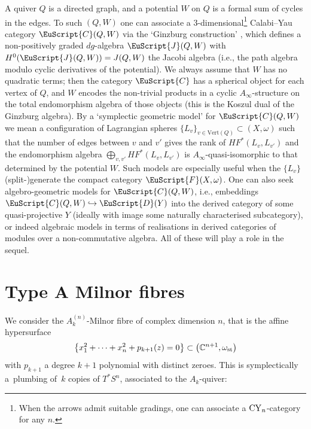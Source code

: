 \documentclass[10pt,a4paper]{amsart}
\def\scrJ{\EuScript{J}}
\newcommand{\scrF}{\EuScript{F}}
\newcommand{\scrC}{\EuScript{C}}
\def\bC{\mathbb{C}}
\def\scrD{\EuScript{D}}
\theoremstyle{definition}
\numberwithin{equation}{section}
\begin{document}
A quiver $Q$ is a directed graph, and a potential $W$ on $Q$ is a formal sum of cycles in the edges. To such $(Q,W)$ one can associate a 3-dimensional\footnote{When the arrows admit suitable gradings, one can associate a ${\rm CY}_n$-category for any $n$.} Calabi--Yau category $\scrC(Q,W)$ via the `Ginzburg construction' \cite{Ginzburg}, which defines a non-positively graded $dg$-algebra $\scrJ(Q,W)$ with $H^0(\scrJ(Q,W)) = J(Q,W)$ the Jacobi algebra (i.e., the path algebra modulo cyclic derivatives of the potential).
We always assume that $W$ has no quadratic terms; then the category $\scrC$ has a spherical object for each vertex of $Q$, and $W$ encodes the non-trivial products in a cyclic $A_{\infty}$-structure on the total endomorphism algebra of those objects (this is the Koszul dual of the Ginzburg algebra). By a `symplectic geometric model' for $\scrC(Q,W)$ we mean a configuration of Lagrangian spheres $\{L_v\}_{v \in \mathrm{Vert}(Q)} \subset (X,\omega)$ such that the number of edges between $v$ and $v'$ gives the rank of $HF^*(L_v,L_{v'})$ and the endomorphism algebra $\bigoplus_{v,v'} HF^*(L_v,L_{v'})$ is $A_{\infty}$-quasi-isomorphic to that determined by the potential $W$. Such models are especially useful when the $\{L_v\}$ (split-)generate the compact category $\scrF(X,\omega)$. One can also seek algebro-geometric models for $\scrC(Q,W)$, i.e., embeddings $\scrC(Q,W) \hookrightarrow \scrD(Y)$ into the derived category of some quasi-projective $Y$ (ideally with image some naturally characterised subcategory), or indeed algebraic models in terms of realisations in derived categories of modules over a non-commutative algebra. All of these will play a role in the sequel.


\section[Type A Milnor fibres]{Type $\boldsymbol{A}$ Milnor fibres}
\label{sec:type-A-Milnor-fibres}

We consider the $A^{(n)}_k$-Milnor fibre of complex dimension $n$, that is the affine hypersurface
\begin{equation} \label{eqn:type A}
 \bigl\{ x_1^2+\dots +x_n^2 + p_{k+1}(z) = 0 \bigr\} \subset \bigl(\bC^{n+1}, \omega_{\rm st}\bigr)
\end{equation}
with $p_{k+1}$ a degree $k+1$ polynomial with distinct zeroes. This is symplectically a~plumbing of~$k$ copies of $T^*S^n$, associated to the $A_k$-quiver:
\end{document}
